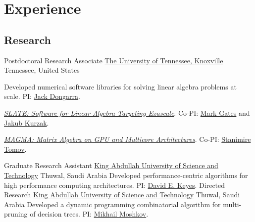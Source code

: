 \documentclass[10pt,a4paper]{moderncv}
\begin{document}
\section{Experience}
{
  \subsection{Research}
  {
    {Postdoctoral Research Associate}
    {\href{https://www.utk.edu/}
    {The University of Tennessee, Knoxville}}
    {Tennessee, United States}{}{
    Developed numerical software libraries
    for solving linear algebra problems at scale. PI:
    \href{http://www.netlib.org/utk/people/JackDongarra/}
    {Jack Dongarra}.
    \begin{itemize}
    {
      \item
      {
        \href{https://icl.utk.edu/slate/}
        {\emph{SLATE: Software for Linear Algebra Targeting Exascale}}.
        Co-PI: \href{http://www.icl.utk.edu/~mgates3/}
        {Mark Gates} and \href{http://www.icl.utk.edu/~kurzak/}
        {Jakub Kurzak}.
      }
      \item
      {
        \href{https://icl.utk.edu/magma/}
        {\emph{MAGMA: Matrix Algebra on GPU and Multicore Architectures}}.
        Co-PI: \href{http://www.icl.utk.edu/~tomov/}
        {Stanimire Tomov}.
      }
    }
    \end{itemize}
  }
  {
    {Graduate Research Assistant}
    {\href{https://www.kaust.edu.sa/en}
    {King Abdullah University of Science and Technology}}
    {Thuwal, Saudi Arabia}{}{
    Developed performance-centric algorithms for
    high performance computing architectures. PI:
    \href{https://www.kaust.edu.sa/en/study/faculty/david-keyes}
    {David E. Keyes}.}
  }
  {
    {Directed Research}
    {\href{https://www.kaust.edu.sa/en}
    {King Abdullah University of Science and Technology}}
    {Thuwal, Saudi Arabia}{}{
    Developed a dynamic programming combinatorial algorithm for
    multi-pruning of decision trees. PI:
    \href{https://www.kaust.edu.sa/en/study/faculty/mikhail-moshkov}
    {Mikhail Moshkov}.}
  }

}}
\end{document}
